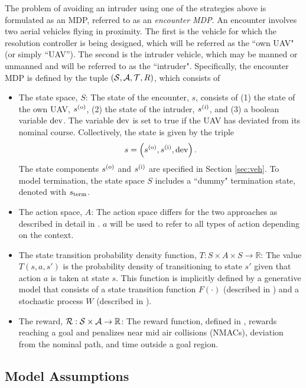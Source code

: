 The problem of avoiding an intruder using one of the strategies above is formulated as an MDP, referred to as an \emph{encounter MDP}. An encounter involves two aerial vehicles flying in proximity. The first is the vehicle for which the resolution controller is being designed, which will be referred as the ``own UAV" (or simply ``UAV''). The second is the intruder vehicle, which may be manned or unmanned and will be referred to as the ``intruder". Specifically, the encounter MDP is defined by the tuple $(\mathcal{S}, \mathcal{A}, \mathcal{T}, R)$, which consists of

\begin{itemize}
    \item The state space, $S$: The state of the encounter, $s$, consists of (1) the state of the own UAV, $s^{(\mathrm{o})}$, (2) the state of the intruder, $s^{(\mathrm{i})}$, and (3) a boolean variable $\mathrm{dev }$. The variable $\mathrm{dev }$ is set to true if the UAV has deviated  from its nominal course. Collectively, the state is given by the triple
        \begin{equation}
            s = \left(s^{(\mathrm{o})}, s^{(\mathrm{i})}, \mathrm{dev }\right) \text{.}
        \end{equation}
        The state components $s^{(\mathrm{o})}$ and $s^{(\mathrm{i})}$ are specified in Section \ref{sec:veh}.
        To model termination, the state space $S$ includes a ``dummy" termination state, denoted with $s_{\mathrm{term}}$.
    \item The action space, $A$: The action space differs for the two approaches as described in detail in . $a$ will be used to refer to all types of action depending on the context.
    \item The state transition probability density function, $T: S \times A \times S \to \mathbb{R}$: The value $T(s,a,s')$ is the probability density of transitioning to state $s'$ given that action $a$ is taken at state $s$. This function is implicitly defined by a generative model that consists of a state transition function $F(\cdot)$ (described in ) and a stochastic process $W$ (described in ).
    \item The reward, $\mathcal{R}:\mathcal{S} \times \mathcal{A} \to \mathbb{R}$: The reward function, defined in , rewards reaching a goal and penalizes near mid air collisions (NMACs), deviation from the nominal path, and time outside a goal region.
\end{itemize}

\subsection{Model Assumptions}\label{sec:assumptions}

